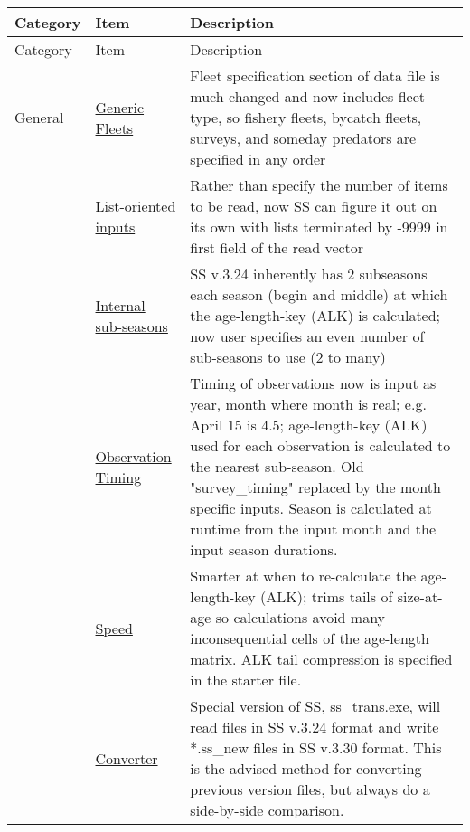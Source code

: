 \begin{center}
	{\renewcommand{\arraystretch}{1.5}%
	\begin{longtable}{p{2cm} p{3cm} p{10cm}}
		\hline
		Category & Item & Description\\
		\hline
		\endfirsthead
		\hline
		\toprule
		Category & Item & Description\\
		\hline
		\endhead

		\hline
		\endfoot

		\endlastfoot
		
		General & 
			\hyperlink{GenericFleets}{Generic Fleets} & 
				Fleet specification section of data file is much changed and now includes fleet type, so fishery fleets, bycatch fleets, surveys, and someday predators are specified in any order\\

		  & \hyperlink{ListBased}{List-oriented inputs} & 
			    Rather than specify the number of items to be read, now SS can figure it out on its own with lists terminated by -9999 in first field of the read vector \\
		  
		  & \hyperlink{SubSeas}{Internal sub-seasons} & 
			    SS v.3.24 inherently has 2 subseasons each season (begin and middle) at which the age-length-key (ALK) is calculated; now user specifies an even number of sub-seasons to use (2 to many) \\

		  & \hyperlink{ObsTiming}{Observation Timing} & 
			    Timing of observations now is input as year, month where month is real; e.g. April 15 is 4.5; age-length-key (ALK) used for each observation is calculated to the nearest sub-season.  Old "survey\_timing" replaced by the month specific inputs.  Season is calculated at runtime from the input month and the input season durations. \\

		  & \hyperlink{ALK}{Speed} & 
			    Smarter at when to re-calculate the age-length-key (ALK); trims tails of size-at-age so calculations avoid many inconsequential cells of the age-length matrix. ALK tail compression is specified in the starter file.\\
		
		  & \hyperlink{Convert} {Converter} & 
			    Special version of SS, ss\_trans.exe, will read files in SS v.3.24 format and write *.ss\_new files in SS v.3.30 format.  This is the advised method for converting previous version files, but always do a side-by-side comparison.\\


\end{longtable}}
\end{center}
